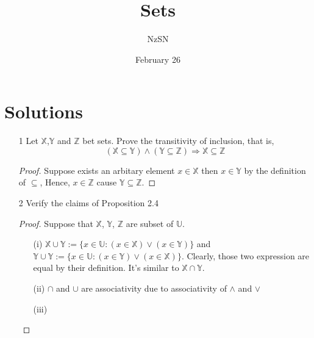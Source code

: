\documentclass[11pt]{book}
\title{Sets}
\author{NzSN}
\date{February 26}
\newcommand{\bb}[1]{\mathbb{#1}}
\newcommand{\Ra}{\Rightarrow}
\begin{document}
\maketitle

\vspace{0.2 cm}
\section{Solutions}

\begin{enumerate}
\item[1]
        Let $\bb{X}$,$\bb{Y}$ and $\bb{Z}$ bet sets.
        Prove the transitivity of inclusion, that is,
        $$(\bb{X} \subseteq \bb{Y}) \land (\bb{Y} \subseteq \bb{Z}) \Ra \bb{X} \subseteq \bb{Z}$$
\begin{proof}
  Suppose exists an arbitary element $x \in \bb{X}$ then $x \in \bb{Y}$ by the definition of $\subseteq$,
  Hence, $x \in \bb{Z}$ cause $\bb{Y} \subseteq \bb{Z}$.
\end{proof}

\item[2]
        Verify the claims of Proposition 2.4
\begin{proof}
Suppose that $\bb{X}$, $\bb{Y}$, $\bb{Z}$ are subset of $\bb{U}$.
\begin{enumerate}
  \item[(i)]
        $\bb{X} \cup \bb{Y} := \{ x \in \bb{U} : (x \in \bb{X}) \lor (x \in \bb{Y}) \}$ and
        $\bb{Y} \cup \bb{Y} := \{ x \in \bb{U} : (x \in \bb{Y}) \lor (x \in \bb{X}) \}$.
        Clearly, those two expression are equal by their definition. It's similar to $\bb{X} \cap \bb{Y}$.
  \item[(ii)]
        $\cap$ and $\cup$ are associativity due to associativity of $\land$ and $\lor$
  \item[(iii)]
\end{enumerate}

\end{proof}

\end{enumerate}
\end{document}
